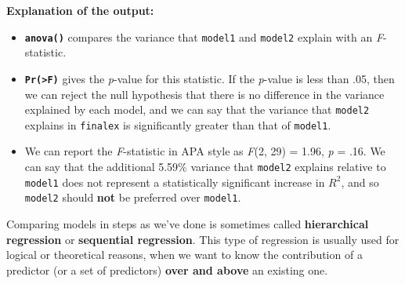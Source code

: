 \documentclass[
]{book}
\theoremstyle{definition}
\theoremstyle{definition}
\theoremstyle{definition}
\theoremstyle{definition}
\theoremstyle{remark}
\begin{document}
\hfill\break
\textbf{Explanation of the output:}

\begin{itemize}
\item
  \textbf{\texttt{anova()}} compares the variance that \texttt{model1} and \texttt{model2} explain with an \emph{F}-statistic.
\item
  \textbf{\texttt{Pr(\textgreater{}F)}} gives the \emph{p}-value for this statistic. If the \emph{p}-value is less than .05, then we can reject the null hypothesis that there is no difference in the variance explained by each model, and we can say that the variance that \texttt{model2} explains in \texttt{finalex} is significantly greater than that of \texttt{model1}.
\item
  We can report the \emph{F}-statistic in APA style as \emph{F}(2, 29) = 1.96, \emph{p} = .16. We can say that the additional 5.59\% variance that \texttt{model2} explains relative to \texttt{model1} does not represent a statistically significant increase in \(R^2\), and so \texttt{model2} should \textbf{not} be preferred over \texttt{model1}.
\end{itemize}

\hfill\break

Comparing models in steps as we've done is sometimes called \textbf{hierarchical regression} or \textbf{sequential regression}. This type of regression is usually used for logical or theoretical reasons, when we want to know the contribution of a predictor (or a set of predictors) \textbf{over and above} an existing one.
\end{document}

